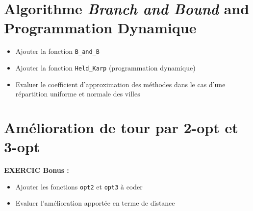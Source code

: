 \documentclass[
]{article}
\begin{document}
\section{\texorpdfstring{Algorithme \emph{Branch and Bound} and
Programmation
Dynamique}{Algorithme Branch and Bound and Programmation Dynamique}}\label{algorithme-branch-and-bound-and-programmation-dynamique}

\begin{itemize}
\item
  Ajouter la fonction \texttt{B\_and\_B}
\item
  Ajouter la fonction \texttt{Held\_Karp} (programmation dynamique)
\item
  Evaluer le coefficient d'approximation des méthodes dans le cas d'une
  répartition uniforme et normale des villes
\end{itemize}

\section{Amélioration de tour par 2-opt et
3-opt}\label{amuxe9lioration-de-tour-par-2-opt-et-3-opt}

\textbf{EXERCIC Bonus :}

\begin{itemize}
\item
  Ajouter les fonctions \texttt{opt2} et \texttt{opt3} à coder
\item
  Evaluer l'amélioration apportée en terme de distance
\end{itemize}
\end{document}
